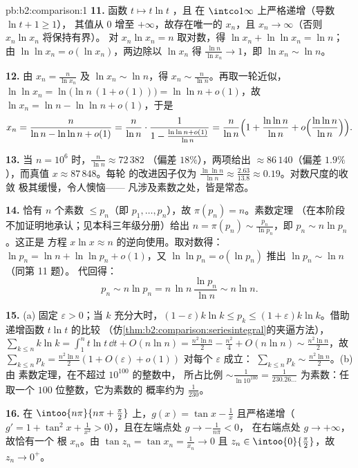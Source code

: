 \begin{solution}{pb:b2:comparison:1}
\textbf{11.} 函数 $t \mapsto t\ln t$ ，且
在 $\intco1\infty$ 上严格递增（导数 $\ln t + 1 \geq 1$），
其值从 $0$ 增至 $+\infty$，故存在唯一的 $x_n$，且 $x_n \to
\infty$（否则 $x_n\ln x_n$ 将保持有界）。
对 $x_n\ln x_n = n$ 取对数，得 $\ln x_n + \ln\ln x_n = \ln n$；
由 $\ln\ln x_n = o(\ln x_n)$，两边除以 $\ln x_n$ 得
$\frac{\ln n}{\ln x_n} \to 1$，即 $\ln x_n \sim \ln n$。

\textbf{12.} 由 $x_n = \frac{n}{\ln x_n}$ 及 $\ln x_n \sim
\ln n$，得 $x_n \sim \frac{n}{\ln n}$。再取一轮近似，$\ln\ln x_n =
\ln\bigl(\ln n\,(1 + o(1))\bigr) = \ln\ln n + o(1)$，故 $\ln
x_n = \ln n - \ln\ln n + o(1)$，于是
\[
x_n = \frac{n}{\ln n - \ln\ln n + o(1)}
= \frac{n}{\ln n}\cdot\frac{1}{1 - \frac{\ln\ln n +
o(1)}{\ln n}}
= \frac{n}{\ln n}\Bigl(1 + \frac{\ln\ln n}{\ln n} +
o\Bigl(\frac{\ln\ln n}{\ln n}\Bigr)\Bigr).
\]

\textbf{13.} 当 $n = 10^6$ 时，$\frac{n}{\ln n} \approx 72\,382$
（偏差 $18\%$），两项给出 $\approx 86\,140$（偏差
$1.9\%$），而真值 $x \approx 87\,848$。每轮
的改进因子仅为 $\frac{\ln\ln n}{\ln n} \approx
\frac{2.63}{13.8} \approx 0.19$。对数尺度的收敛
极其缓慢，令人懊恼——
凡涉及素数之处，皆是常态。

\textbf{14.} 恰有 $n$ 个素数 $\leq p_n$（即
$p_1, \dots, p_n$），故 $\pi(p_n) = n$。素数定理
（在本阶段不加证明地承认；见本科三年级分册）给出 $n = \pi(p_n) \sim
\frac{p_n}{\ln p_n}$，即 $p_n \sim n\ln p_n$。这正是
方程 $x\ln x \approx n$ 的逆向使用。取对数得：
$\ln p_n = \ln n + \ln\ln p_n + o(1)$，又 $\ln\ln p_n =
o(\ln p_n)$ 推出 $\ln p_n \sim \ln n$（同第 11 题）。
代回得：
\[
p_n \sim n\ln p_n = n\,\ln n\,\frac{\ln p_n}{\ln n} \sim n\ln
n .
\]

\textbf{15.} (a) 固定 $\varepsilon > 0$；当 $k$ 充分大时，$(1 -
\varepsilon)k\ln k \leq p_k \leq (1 + \varepsilon)k\ln k$。借助
递增函数 $t\ln t$ 的比较
（仿\cref{thm:b2:comparison:seriesintegral}的夹逼方法），
$\sum_{k\leq n}k\ln k = \int_1^n t\ln t\,\dd t + O(n\ln n) =
\frac{n^2\ln n}2 - \frac{n^2}4 + O(n\ln n) \sim
\frac{n^2\ln n}2$，故 $\sum_{k\leq n}p_k = \frac{n^2\ln
n}{2}(1 + O(\varepsilon) + o(1))$ 对每个 $\varepsilon$ 成立：
$\sum_{k\leq n}p_k \sim \frac{n^2\ln n}2$。(b) 由
素数定理，在不超过 $10^{100}$ 的整数中，
所占比例 $\sim \frac{1}{\ln 10^{100}} = \frac1{230.26\dots}$
为素数：任取一个 $100$ 位整数，它为素数的
概率约为 $\frac1{230}$。

\textbf{16.} 在 $\intoo{n\pi}{n\pi + \frac\pi2}$ 上，$g(x) = \tan
x - \frac1x$ 且严格递增（$g' = 1 +
\tan^2x + \frac1{x^2} > 0$），且在左端点处 $g \to -\frac1{n\pi} < 0$，
在右端点处 $g \to +\infty$，故恰有一个
根 $x_n$。由 $\tan z_n = \tan x_n = \frac1{x_n} \to 0$
且 $z_n \in \intoo{0}{\frac\pi2}$，故 $z_n \to 0^+$。


\end{solution}
